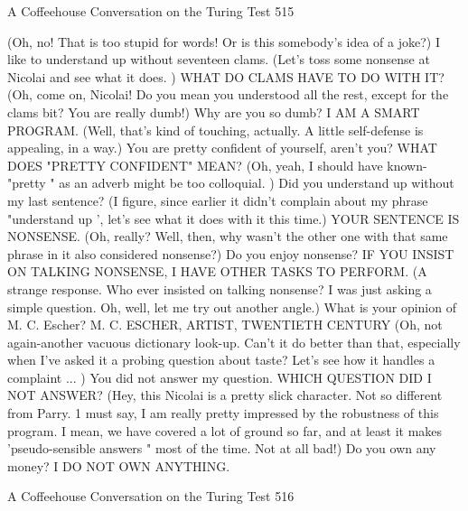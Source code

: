 A Coffeehouse Conversation on the Turing Test                                       515

(Oh, no! That is too stupid for words! Or is this somebody's idea of a joke?)
I like to understand up without seventeen clams.
(Let's toss some nonsense at Nicolai and see what it does. )
WHAT DO CLAMS HAVE TO DO WITH IT?
(Oh, come on, Nicolai! Do you mean you understood all the rest, except for the clams
bit? You are really dumb!)
Why are you so dumb?
I AM A SMART PROGRAM.
(Well, that's kind of touching, actually. A little self-defense is appealing, in a way.)
You are pretty confident of yourself, aren't you?
WHAT DOES "PRETTY CONFIDENT" MEAN?
(Oh, yeah, I should have known- "pretty " as an adverb might be too colloquial. )
Did you understand up without my last sentence?
(I figure, since earlier it didn't complain about my phrase "understand up ', let's see
what it does with it this time.)
YOUR SENTENCE IS NONSENSE.
(Oh, really? Well, then, why wasn't the other one with that same phrase in it also
considered nonsense?)
Do you enjoy nonsense?
IF YOU INSIST ON TALKING NONSENSE, I HAVE OTHER TASKS TO
PERFORM.
(A strange response. Who ever insisted on talking nonsense? I was just asking a
simple question. Oh, well, let me try out another angle.)
What is your opinion of M. C. Escher?
M. C. ESCHER, ARTIST, TWENTIETH CENTURY
(Oh, not again-another vacuous dictionary look-up. Can't it do better than that,
especially when I've asked it a probing question about taste? Let's see how it handles
a complaint ... )
You did not answer my question.
WHICH QUESTION DID I NOT ANSWER?
(Hey, this Nicolai is a pretty slick character. Not so different from Parry. 1 must say, I
am really pretty impressed by the robustness of this program. I mean, we have
covered a lot of ground so far, and at least it makes 'pseudo-sensible answers " most
of the time. Not at all bad!)
Do you own any money?
I DO NOT OWN ANYTHING.




A Coffeehouse Conversation on the Turing Test                                         516

